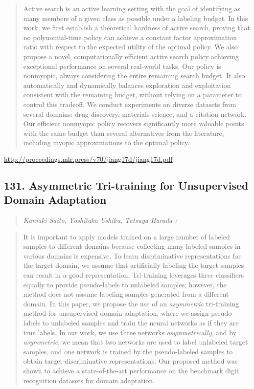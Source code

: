 \documentclass{article}
\begin{document}
\begin{quote}
    Active search is an active learning setting with the goal of identifying as many members of a given class as possible under a labeling budget. In this work, we first establish a theoretical hardness of active search, proving that no polynomial-time policy can achieve a constant factor approximation ratio with respect to the expected utility of the optimal policy. We also propose a novel, computationally efficient active search policy achieving exceptional performance on several real-world tasks. Our policy is nonmyopic, always considering the entire remaining search budget. It also automatically and dynamically balances exploration and exploitation consistent with the remaining budget, without relying on a parameter to control this tradeoff. We conduct experiments on diverse datasets from several domains: drug discovery, materials science, and a citation network. Our efficient nonmyopic policy recovers significantly more valuable points with the same budget than several alternatives from the literature, including myopic approximations to the optimal policy.  \end{quote}

\href{http://proceedings.mlr.press/v70/jiang17d/jiang17d.pdf}{http://proceedings.mlr.press/v70/jiang17d/jiang17d.pdf}

\subsection{131. Asymmetric Tri-training for Unsupervised Domain Adaptation}

\begin{quote}
\footnotesize{\textit{Kuniaki Saito, Yoshitaka Ushiku, Tatsuya Harada ;}}
\end{quote}

\begin{quote}
    It is important to apply models trained on a large number of labeled samples to different domains because collecting many labeled samples in various domains is expensive. To learn discriminative representations for the target domain, we assume that artificially labeling the target samples can result in a good representation. Tri-training leverages three classifiers equally to provide pseudo-labels to unlabeled samples; however, the method does not assume labeling samples generated from a different domain. In this paper, we propose the use of an \textit{asymmetric} tri-training method for unsupervised domain adaptation, where we assign pseudo-labels to unlabeled samples and train the neural networks as if they are true labels. In our work, we use three networks \textit{asymmetrically}, and by \textit{asymmetric}, we mean that two networks are used to label unlabeled target samples, and one network is trained by the pseudo-labeled samples to obtain target-discriminative representations. Our proposed method was shown to achieve a state-of-the-art performance on the benchmark digit recognition datasets for domain adaptation.  \end{quote}
\end{document}
